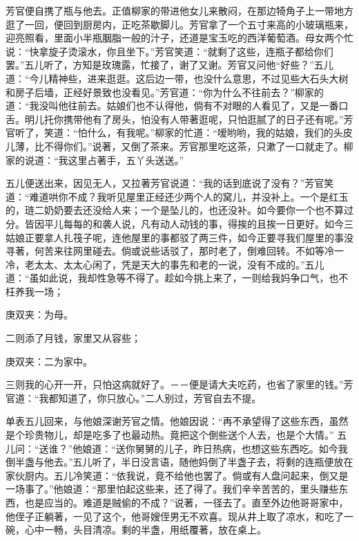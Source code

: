 \begin{parag}
    芳官便自携了瓶与他去。正值柳家的带进他女儿来散闷，在那边犄角子上一带地方逛了一回，便回到厨房内，正吃茶歇脚儿。芳官拿了一个五寸来高的小玻璃瓶来，迎亮照看，里面小半瓶胭脂一般的汁子，还道是宝玉吃的西洋葡萄酒。母女两个忙说：“快拿旋子烫滚水，你且坐下。”芳官笑道：“就剩了这些，连瓶子都给你们罢。”五儿听了，方知是玫瑰露，忙接了，谢了又谢。芳官又问他“好些？”五儿道：“今儿精神些，进来逛逛。这后边一带，也没什么意思，不过见些大石头大树和房子后墙，正经好景致也没看见。”芳官道：“你为什么不往前去？”柳家的道：“我没叫他往前去。姑娘们也不认得他，倘有不对眼的人看见了，又是一番口舌。明儿托你携带他有了房头，怕没有人带著逛呢，只怕逛腻了的日子还有呢。”芳官听了，笑道：“怕什么，有我呢。”柳家的忙道：“嗳哟哟，我的姑娘，我们的头皮儿薄，比不得你们。”说著，又倒了茶来。芳官那里吃这茶，只漱了一口就走了。柳家的说道：“我这里占著手，五丫头送送。”
\end{parag}


\begin{parag}
    五儿便送出来，因见无人，又拉著芳官说道：“我的话到底说了没有？”芳官笑道：“难道哄你不成？我听见屋里正经还少两个人的窝儿，并没补上。一个是红玉的，琏二奶奶要去还没给人来；一个是坠儿的，也还没补。如今要你一个也不算过分。皆因平儿每每的和袭人说，凡有动人动钱的事，得挨的且挨一日更好。如今三姑娘正要拿人扎筏子呢，连他屋里的事都驳了两三件，如今正要寻我们屋里的事没寻著，何苦来往网里碰去。倘或说些话驳了，那时老了，倒难回转。不如等冷一冷，老太太、太太心闲了，凭是天大的事先和老的一说，没有不成的。”五儿道：“虽如此说，我却性急等不得了。趁如今挑上来了，一则给我妈争口气，也不枉养我一场；\begin{note}庚双夹：为母。\end{note}二则添了月钱，家里又从容些；\begin{note}庚双夹：二为家中。\end{note}三则我的心开一开，只怕这病就好了。－－便是请大夫吃药，也省了家里的钱。”芳官道：“我都知道了，你只放心。”二人别过，芳官自去不提。
\end{parag}


\begin{parag}
    单表五儿回来，与他娘深谢芳官之情。他娘因说：“再不承望得了这些东西，虽然是个珍贵物儿，却是吃多了也最动热。竟把这个倒些送个人去，也是个大情。” 五儿问：“送谁？”他娘道：“送你舅舅的儿子，昨日热病，也想这些东西吃。如今我倒半盏与他去。”五儿听了，半日没言语，随他妈倒了半盏子去，将剩的连瓶便放在家伙厨内。五儿冷笑道：“依我说，竟不给他也罢了。倘或有人盘问起来，倒又是一场事了。”他娘道：“那里怕起这些来，还了得了。我们辛辛苦苦的，里头赚些东西，也是应当的。难道是贼偷的不成？”说著，一径去了。直至外边他哥哥家中，他侄子正躺著，一见了这个，他哥嫂侄男无不欢喜。现从井上取了凉水，和吃了一碗，心中一畅，头目清凉。剩的半盏，用纸覆著，放在桌上。
\end{parag}


